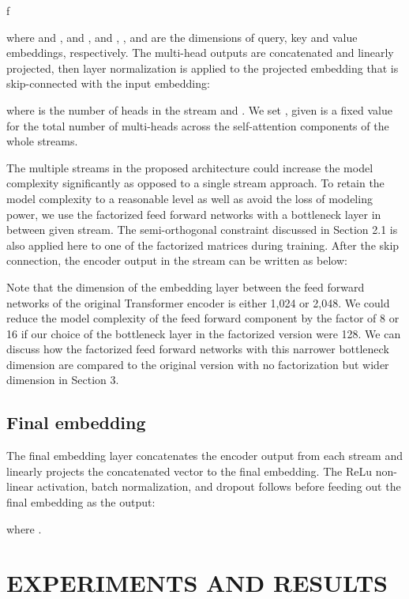 f\documentclass{article}
\begin{document}
where  and ,  and ,  and , , and  are the dimensions of query, key and value embeddings, respectively. The multi-head outputs are concatenated and linearly projected, then layer normalization is applied to the projected embedding that is skip-connected with the input embedding:

where  is the number of heads in the stream  and . We set , given  is a fixed value for the total number of multi-heads across the self-attention components of the whole streams.

The multiple streams in the proposed architecture could increase the model complexity significantly as opposed to a single stream approach. To retain the model complexity to a reasonable level as well as avoid the loss of modeling power, we use the factorized feed forward networks with a bottleneck layer in between given stream. The semi-orthogonal constraint discussed in Section 2.1 is also applied here to one of the factorized matrices during training. After the skip connection, the encoder output in the stream  can be written as below:


Note that the dimension   of the embedding layer between the feed forward networks of the original Transformer encoder \cite{vaswani} is either 1,024 or 2,048. We could reduce the model complexity of the feed forward component by the factor of 8 or 16 if our choice of the bottleneck layer in the factorized version were 128. We can discuss how the factorized feed forward networks with this narrower bottleneck dimension are compared to the original version with no factorization but wider dimension in Section 3. 

\subsection{Final embedding}
The final embedding layer concatenates the encoder output from each stream and linearly projects the concatenated vector to the final embedding. The ReLu non-linear activation, batch normalization, and dropout follows before feeding out the final embedding as the output:


where .


\section{EXPERIMENTS AND RESULTS}
\end{document}
